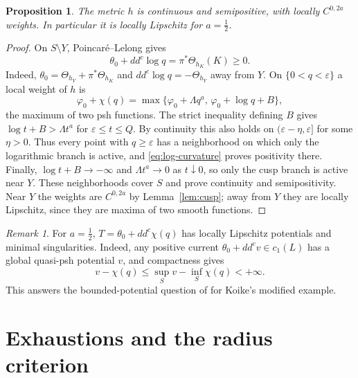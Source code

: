 \documentclass[11pt]{amsart}
\newtheorem{proposition}[theorem]{Proposition}
\theoremstyle{definition}
\theoremstyle{remark}
\newtheorem{remark}[theorem]{Remark}
\numberwithin{equation}{section}
\newcommand{\ddc}{dd^c}
\begin{document}
\begin{proposition}\label{prop:continuous-metric}
The metric $h$ is continuous and semipositive, with locally
$C^{0,2a}$ weights. In particular it is locally Lipschitz for
$a=\tfrac12$.
\end{proposition}
\begin{proof}
On $S\setminus Y$, Poincar\'e--Lelong gives
\begin{equation}\label{eq:log-curvature}
 \theta_0+\ddc\log q=\pi^*\Theta_{h_K}(K)\ge0.
\end{equation}
Indeed, $\theta_0=\Theta_{h_Y}+\pi^*\Theta_{h_K}$ and
$\ddc\log q=-\Theta_{h_Y}$ away from $Y$.
On $\{0<q<\varepsilon\}$ a local weight of $h$ is
\[
 \varphi_0+\chi(q)
 =\max\{\varphi_0+\Lambda q^a,\,
          \varphi_0+\log q+B\},
\]
the maximum of two psh functions. The strict inequality defining
$B$ gives $\log t+B>\Lambda t^a$ for
$\varepsilon\le t\le Q$. By continuity this also holds on
$(\varepsilon-\eta,\varepsilon]$ for some $\eta>0$.
Thus every point with $q\ge\varepsilon$ has a neighborhood on
which only the logarithmic branch is active, and
\eqref{eq:log-curvature} proves positivity there.
Finally, $\log t+B\to-\infty$ and $\Lambda t^a\to0$ as
$t\downarrow0$, so only the cusp branch is active near $Y$.
These neighborhoods cover $S$ and prove continuity and
semipositivity. Near $Y$ the weights are $C^{0,2a}$ by
Lemma~\ref{lem:cusp}; away from $Y$ they are locally Lipschitz,
since they are maxima of two smooth functions.
\end{proof}

\begin{remark}\label{rem:minimal}
For $a=\tfrac12$, $T=\theta_0+\ddc\chi(q)$ has locally Lipschitz
potentials and minimal singularities. Indeed, any positive current
$\theta_0+\ddc v\in c_1(L)$ has a global quasi-psh potential $v$,
and compactness gives
\[
 v-\chi(q)\le\sup_Sv-\inf_S\chi(q)<+\infty.
\]
This answers the bounded-potential question of
\cite[Section~4]{Zhang2025} for Koike's modified example.
\end{remark}

\section{Exhaustions and the radius criterion}\label{sec:radius}
\end{document}
